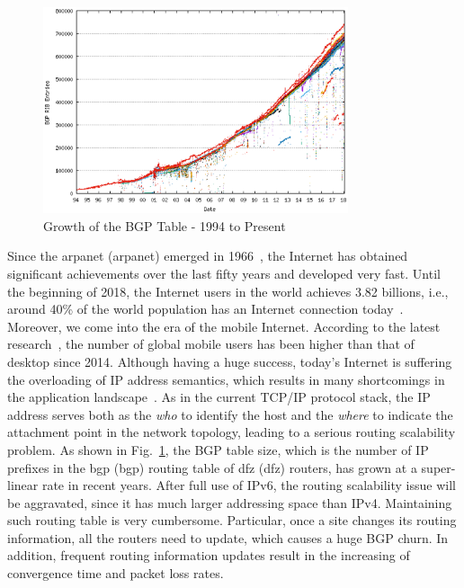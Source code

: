 \begin{figure}[t]
	\centering
	\includegraphics[width=0.8\textwidth]{Pics/Growth_BGP_Table.eps}
	\caption{Growth of the BGP Table - 1994 to Present}
	\label{Growth_BGP_Table}
\end{figure}
Since the \acrshort{arpanet} (\acrlong{arpanet}) emerged in 1966~\cite{marill1966toward}, the Internet has obtained significant achievements over the last fifty years and developed very fast. Until the beginning of 2018, the Internet users in the world achieves 3.82 billions, i.e., around 40\% of the world population has an Internet connection today~\cite{InternetLiveStats}. Moreover, we come into the era of the mobile Internet. According to the latest research~\cite{SmartInsights}, the number of global mobile users has been higher than that of desktop since 2014. Although having a huge success, today's Internet is suffering the overloading of IP address semantics, which results in many shortcomings in the application landscape~\cite{feng2017locator}. As in the current TCP/IP protocol stack, the IP address serves both as the \emph{who} to identify the host and the \emph{where} to indicate the attachment point in the network topology, leading to a serious routing scalability problem. As shown in Fig.~\ref{Growth_BGP_Table}, the BGP table size, which is the number of IP prefixes in the \acrshort{bgp} (\acrlong{bgp}) routing table of \acrshort{dfz} (\acrlong{dfz}) routers, has grown at a super-linear rate in recent years. After full use of IPv6, the routing scalability issue will be aggravated, since it has much larger addressing space than IPv4. Maintaining such routing table is very cumbersome. Particular, once a site changes its routing information, all the routers need to update, which causes a huge BGP churn. In addition, frequent routing information updates result in the increasing of convergence time and packet loss rates.

